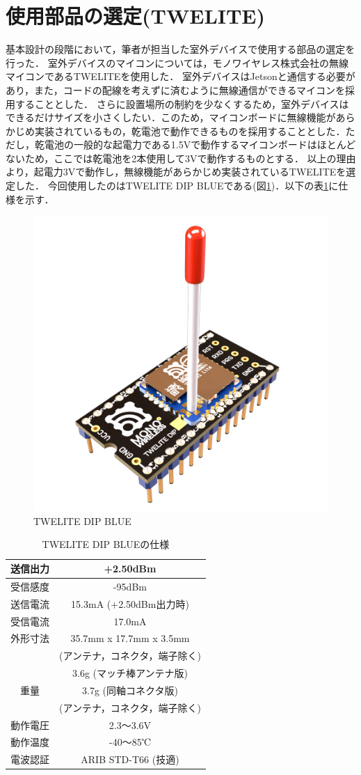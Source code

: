 
\section{使用部品の選定(TWELITE)}

基本設計の段階において，筆者が担当した室外デバイスで使用する部品の選定を行った．
室外デバイスのマイコンについては，モノワイヤレス株式会社の無線マイコンであるTWELITEを使用した\cite{twelite}．
室外デバイスはJetsonと通信する必要があり，また，コードの配線を考えずに済むように無線通信ができるマイコンを採用することとした．
さらに設置場所の制約を少なくするため，室外デバイスはできるだけサイズを小さくしたい．このため，マイコンボードに無線機能があらかじめ実装されているもの，乾電池で動作できるものを採用することとした．ただし，乾電池の一般的な起電力である1.5Vで動作するマイコンボードはほとんどないため，ここでは乾電池を2本使用して3Vで動作するものとする．
以上の理由より，起電力3Vで動作し，無線機能があらかじめ実装されているTWELITEを選定した．
今回使用したのはTWELITE DIP BLUEである(図\ref{tweblue})．以下の表\ref{siyou}に仕様を示す．

\begin{figure}
	\centering
	\includegraphics[width=0.3\linewidth]{tweblue}
	\caption{TWELITE DIP BLUE}
	\label{tweblue}
\end{figure}

\begin{table}
	\centering
	\caption{TWELITE DIP BLUEの仕様}
	\begin{tabular}{|c|c|}
		\hline
		送信出力 & +2.50dBm \\
		\hline
		受信感度 & -95dBm \\
		\hline
		送信電流 & 15.3mA (+2.50dBm出力時) \\
		\hline
		受信電流 & 17.0mA \\
		\hline
		外形寸法 & 35.7mm x 17.7mm x 3.5mm \\
		
		& (アンテナ，コネクタ，端子除く) \\
		\hline
		& 3.6g (マッチ棒アンテナ版) \\
		
		重量 & 3.7g (同軸コネクタ版) \\
		
		& (アンテナ，コネクタ，端子除く) \\
		\hline
		動作電圧 & 2.3～3.6V \\
		\hline
		動作温度 & -40～85℃ \\
		\hline
		電波認証 & ARIB STD-T66 (技適) \\
		\hline
	\end{tabular}
	\label{siyou}
\end{table}
\newpage